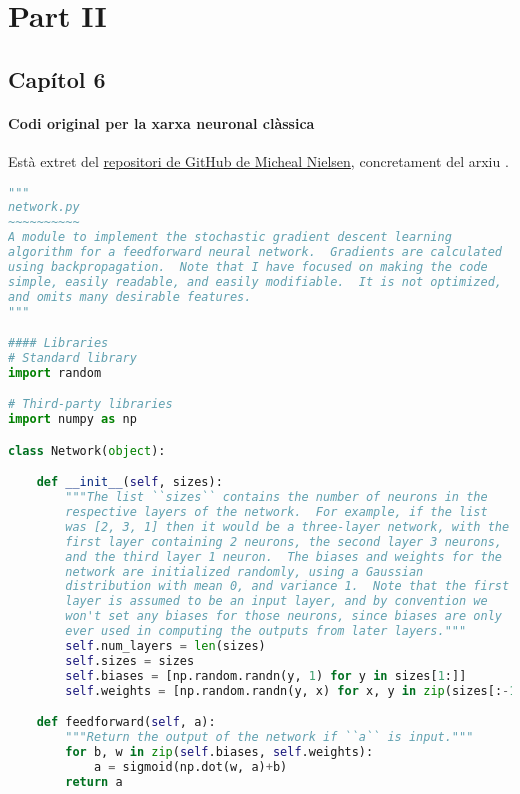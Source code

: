 \section{Part II}
\subsection{Capítol 6}

\paragraph{Codi original per la xarxa neuronal clàssica}
\label{lst:disc_original}
Està extret del \href{https://github.com/mnielsen/neural-networks-and-deep-learning}{repositori de GitHub de Micheal Nielsen}, concretament del arxiu .


\begin{lstlisting}[language=Python, caption=Codi original per la xarxa neuronal clàssica]
"""
network.py
~~~~~~~~~~
A module to implement the stochastic gradient descent learning
algorithm for a feedforward neural network.  Gradients are calculated
using backpropagation.  Note that I have focused on making the code
simple, easily readable, and easily modifiable.  It is not optimized,
and omits many desirable features.
"""

#### Libraries
# Standard library
import random

# Third-party libraries
import numpy as np

class Network(object):

	def __init__(self, sizes):
		"""The list ``sizes`` contains the number of neurons in the
		respective layers of the network.  For example, if the list
		was [2, 3, 1] then it would be a three-layer network, with the
		first layer containing 2 neurons, the second layer 3 neurons,
		and the third layer 1 neuron.  The biases and weights for the
		network are initialized randomly, using a Gaussian
		distribution with mean 0, and variance 1.  Note that the first
		layer is assumed to be an input layer, and by convention we
		won't set any biases for those neurons, since biases are only
		ever used in computing the outputs from later layers."""
		self.num_layers = len(sizes)
		self.sizes = sizes
		self.biases = [np.random.randn(y, 1) for y in sizes[1:]]
		self.weights = [np.random.randn(y, x) for x, y in zip(sizes[:-1], sizes[1:])]

	def feedforward(self, a):
		"""Return the output of the network if ``a`` is input."""
		for b, w in zip(self.biases, self.weights):
			a = sigmoid(np.dot(w, a)+b)
		return a


\end{lstlisting}

